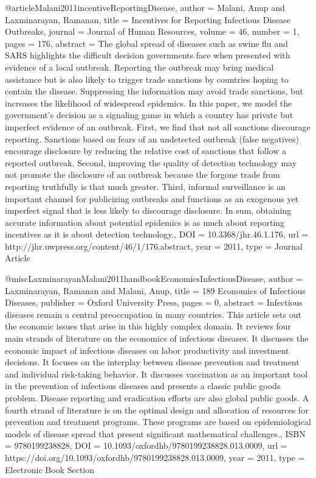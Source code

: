 @article{Malani2011incentiveReportingDisease,
   author = {Malani, Anup and Laxminarayan, Ramanan},
   title = {Incentives for Reporting Infectious Disease Outbreaks},
   journal = {Journal of Human Resources},
   volume = {46},
   number = {1},
   pages = {176},
   abstract = {The global spread of diseases such as swine flu and SARS highlights the difficult decision governments face when presented with evidence of a local outbreak. Reporting the outbreak may bring medical assistance but is also likely to trigger trade sanctions by countries hoping to contain the disease. Suppressing the information may avoid trade sanctions, but increases the likelihood of widespread epidemics. In this paper, we model the government’s decision as a signaling game in which a country has private but imperfect evidence of an outbreak. First, we find that not all sanctions discourage reporting. Sanctions based on fears of an undetected outbreak (false negatives) encourage disclosure by reducing the relative cost of sanctions that follow a reported outbreak. Second, improving the quality of detection technology may not promote the disclosure of an outbreak because the forgone trade from reporting truthfully is that much greater. Third, informal surveillance is an important channel for publicizing outbreaks and functions as an exogenous yet imperfect signal that is less likely to discourage disclosure. In sum, obtaining accurate information about potential epidemics is as much about reporting incentives as it is about detection technology.},
   DOI = {10.3368/jhr.46.1.176},
   url = {http://jhr.uwpress.org/content/46/1/176.abstract},
   year = {2011},
   type = {Journal Article}
}


@misc{LaxminarayanMalani2011handbookEconomicsInfectiousDisease,
   author = {Laxminarayan, Ramanan and Malani, Anup},
   title = {189 Economics of Infectious Diseases},
   publisher = {Oxford University Press},
   pages = {0},
   abstract = {Infectious diseases remain a central preoccupation in many countries. This article sets out the economic issues that arise in this highly complex domain. It reviews four main strands of literature on the economics of infectious diseases. It discusses the economic impact of infectious diseases on labor productivity and investment decisions. It focuses on the interplay between disease prevention and treatment and individual risk-taking behavior. It discusses vaccination as an important tool in the prevention of infectious diseases and presents a classic public goods problem. Disease reporting and eradication efforts are also global public goods. A fourth strand of literature is on the optimal design and allocation of resources for prevention and treatment programs. These programs are based on epidemiological models of disease spread that present significant mathematical challenges.},
   ISBN = {9780199238828},
   DOI = {10.1093/oxfordhb/9780199238828.013.0009},
   url = {https://doi.org/10.1093/oxfordhb/9780199238828.013.0009},
   year = {2011},
   type = {Electronic Book Section}
}



